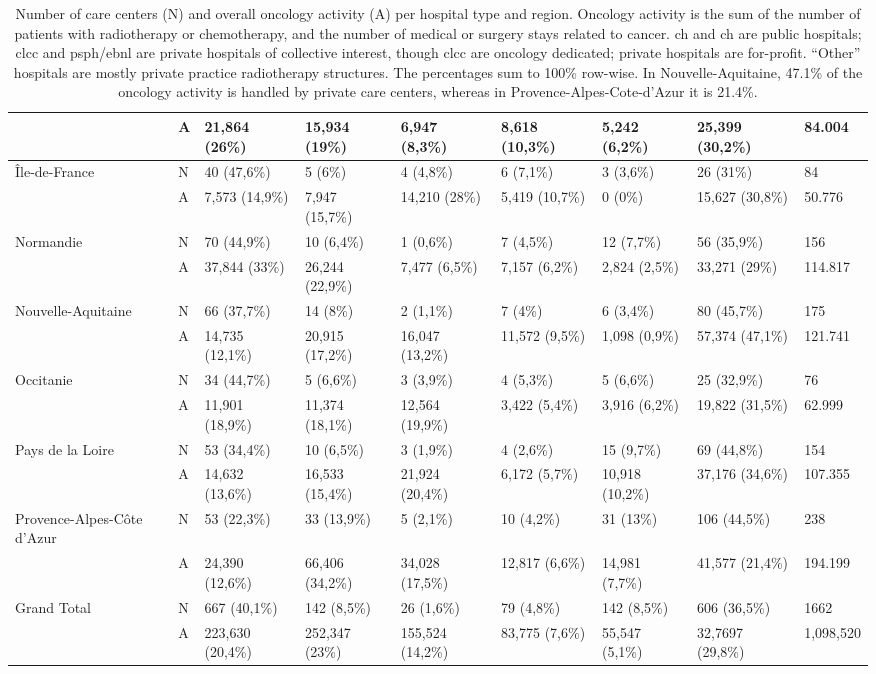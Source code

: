 \begin{table}[H]
{\begin{tabular}{|l|l|l|l|l|l|l|l|l|}
        ~ & A & 21,864 (26\%) & 15,934 (19\%) & 6,947 (8,3\%) & 8,618 (10,3\%) & 5,242 (6,2\%) & 25,399 (30,2\%) & 84.004 \\ \hline
        Île-de-France & N & 40 (47,6\%) & 5 (6\%) & 4 (4,8\%) & 6 (7,1\%) & 3 (3,6\%) & 26 (31\%) & 84 \\
        ~ & A & 7,573 (14,9\%) & 7,947 (15,7\%) & 14,210 (28\%) & 5,419 (10,7\%) & 0 (0\%) & 15,627 (30,8\%) & 50.776 \\ \hline
        Normandie & N & 70 (44,9\%) & 10 (6,4\%) & 1 (0,6\%) & 7 (4,5\%) & 12 (7,7\%) & 56 (35,9\%) & 156 \\
        ~ & A & 37,844 (33\%) & 26,244 (22,9\%) & 7,477 (6,5\%) & 7,157 (6,2\%) & 2,824 (2,5\%) & 33,271 (29\%) & 114.817 \\ \hline
        Nouvelle-Aquitaine & N & 66 (37,7\%) & 14 (8\%) & 2 (1,1\%) & 7 (4\%) & 6 (3,4\%) & 80 (45,7\%) & 175 \\
        ~ & A & 14,735 (12,1\%) & 20,915 (17,2\%) & 16,047 (13,2\%) & 11,572 (9,5\%) & 1,098 (0,9\%) & 57,374 (47,1\%) & 121.741 \\ \hline
        Occitanie & N & 34 (44,7\%) & 5 (6,6\%) & 3 (3,9\%) & 4 (5,3\%) & 5 (6,6\%) & 25 (32,9\%) & 76 \\
        ~ & A & 11,901 (18,9\%) & 11,374 (18,1\%) & 12,564 (19,9\%) & 3,422 (5,4\%) & 3,916 (6,2\%) & 19,822 (31,5\%) & 62.999 \\ \hline
        Pays de la Loire & N & 53 (34,4\%) & 10 (6,5\%) & 3 (1,9\%) & 4 (2,6\%) & 15 (9,7\%) & 69 (44,8\%) & 154 \\
        ~ & A & 14,632 (13,6\%) & 16,533 (15,4\%) & 21,924 (20,4\%) & 6,172 (5,7\%) & 10,918 (10,2\%) & 37,176 (34,6\%) & 107.355 \\ \hline
        Provence-Alpes-Côte d'Azur & N & 53 (22,3\%) & 33 (13,9\%) & 5 (2,1\%) & 10 (4,2\%) & 31 (13\%) & 106 (44,5\%) & 238 \\
        ~ & A & 24,390 (12,6\%) & 66,406 (34,2\%) & 34,028 (17,5\%) & 12,817 (6,6\%) & 14,981 (7,7\%) & 41,577 (21,4\%) & 194.199 \\ \hline
        Grand Total & N & 667 (40,1\%) & 142 (8,5\%) & 26 (1,6\%) & 79 (4,8\%) & 142 (8,5\%) & 606 (36,5\%) & 1662 \\
        ~ & A & 223,630 (20,4\%) & 252,347 (23\%) & 155,524 (14,2\%) & 83,775 (7,6\%) & 55,547 (5,1\%) & 32,7697 (29,8\%) & 1,098,520 \\ \hline
    \end{tabular}}
    \caption{
        Number of care centers (N) and overall oncology activity (A) per hospital type and region. Oncology activity is the sum of the number of patients with radiotherapy or chemotherapy, and the number of medical or surgery stays related to cancer. \ac{ch} and \ac{ch} are public hospitals; \ac{clcc} and \ac{psph}/\ac{ebnl} are private hospitals of collective interest, though \acs{clcc} are oncology dedicated; private hospitals are for-profit. “Other” hospitals are mostly private practice radiotherapy structures. The percentages sum to 100\% row-wise. In Nouvelle-Aquitaine, 47.1\% of the oncology activity is handled by private care centers, whereas in Provence-Alpes-Cote-d’Azur it is 21.4\%.
}
\end{table}
